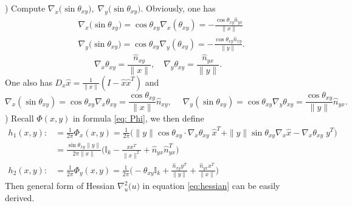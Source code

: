 \documentclass{amsart}%
\begin{document}
) Compute $\nabla_x\Big(\sin\theta_{xy}\Big),\; \nabla_y\Big(\sin\theta_{xy}\Big).$ Obviously, one has
\begin{align*}
&\nabla_x\Big(\sin\theta_{xy}\Big)=\cos\theta_{xy}\nabla_x(\theta_{xy})=-\frac{\cos\theta_{xy}\hat{n}_{yx}}{\|x\|}\\
&\nabla_y\Big(\sin\theta_{xy}\Big)=\cos\theta_{xy}\nabla_y(\theta_{xy})=-\frac{\cos\theta_{xy}\hat{n}_{xy}}{\|y\|}.
\end{align*}
\[
\nabla_x\theta_{xy}=\frac{\hat{n}_{xy}}{\|x\|},\quad \nabla_y\theta_{xy}=\frac{\hat{n}_{yx}}{\|y\|}.
\]
One also has $D_x\hat{x}=\frac{1}{\|x\|}(I-\hat{x}\hat{x}^T)$ and 
\[
\nabla_x(\sin\theta_{xy})=\cos\theta_{xy}\nabla_x\theta_{xy}=\frac{\cos\theta_{xy}}{\|x\|}\hat{n}_{xy},\;\quad \nabla_y(\sin\theta_{xy})=\cos\theta_{xy}\nabla_y\theta_{xy}=\frac{\cos\theta_{xy}}{\|y\|}\hat{n}_{yx}.
\]
) Recall $\Phi(x,y)$ in formula \eqref{eq: Phi}, we then define 
\begin{align*}
h_1(x,y):&=\frac{1}{2\pi}\Phi_x(x,y)=\frac{1}{2\pi}\Big(\|y\|\cos\theta_{xy}\cdot \nabla_x\theta_{xy}\;\hat{x}^T+\|y\|\sin\theta_{xy}\nabla_x\hat{x}-\nabla_x\theta_{xy}\; y^T\Big)
\\&=\frac{\sin\theta_{xy} \|y\|}{2\pi \|x\|}\Big(\mathbb I_k-\frac{xx^T}{\|x\|^2}+\hat{n}_{yx}\hat{n}_{yx}^T\Big)\\
    h_2(x,y):&=\frac{1}{2\pi}\Phi_y(x,y)=\frac{1}{2\pi}\Big(-\theta_{xy}\mathbb I_k+\frac{\hat{n}_{xy}y^T}{\|y\|}+\frac{\hat{n}_{yx}x^T}{\|x\|}\Big)
\end{align*}
Then general form of Hessian $\nabla^2_u\mathcal (u)$ in equation \eqref{eq:hessian} can be easily derived.
\end{document}
